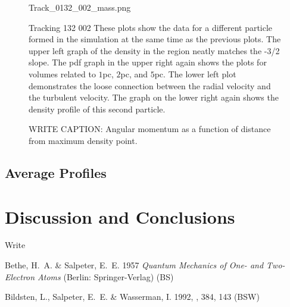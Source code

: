 \documentclass{emulateapj}
\begin{document}
\begin{figure}
 {Track_0132_002_mass.png}
\caption{Tracking 132 002  These plots show the data for a different particle formed in the simulation at the same time as the previous plots.  The upper left graph of the density in the region neatly matches the -3/2 slope.  The pdf graph in the upper right again shows the plots for volumes related to $1$pc, $2$pc, and $5$pc.  The lower left plot demonstrates the loose connection between the radial velocity and the turbulent velocity.  The graph on the lower right again shows the density profile of this second particle.     \label{fig:132_002_graphs}}
\end{figure}




\begin{figure}
\caption{WRITE CAPTION: Angular momentum as a function of distance from maximum density point.     \label{fig:angular_momentum_example}}
\end{figure}



\subsection{Average Profiles}

\section{Discussion and Conclusions}

\acknowledgments

Write

\begin{references}

\noindent
Bethe, H.~A. \& Salpeter, E.~E. 1957 \textit{Quantum Mechanics of One-
  and Two-Electron Atoms} (Berlin: Springer-Verlag) (BS) 

\noindent
Bildsten, L., Salpeter, E.~E. \& Wasserman, I. 1992, \apj, 384, 143
(BSW) 


\end{references}
\end{document}
